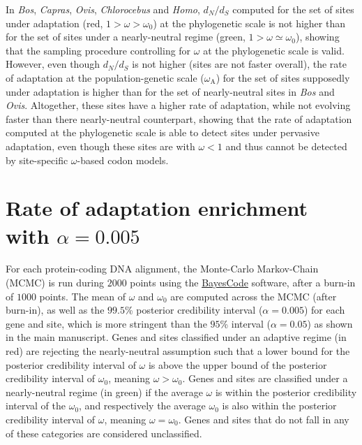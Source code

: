 \documentclass{article}
\renewcommand*{\bm}[1]{#1}%
\newcommand{\dn}{d_N}
\newcommand{\ds}{d_S}
\newcommand{\dnds}{\dn / \ds}
\newcommand{\rateApop}{\omega_{\mathrm{A}}}
\begin{document}
    In \textit{Bos}, \textit{Capras}, \textit{Ovis}, \textit{Chlorocebus} and \textit{Homo}, $\dnds$ computed for the set of sites under adaptation (red, $1 > \omega > \omega_{0}$) at the phylogenetic scale is not higher than for the set of sites under a nearly-neutral regime (green, $1 > \omega \simeq \omega_{0}$), showing that the sampling procedure controlling for $\omega$ at the phylogenetic scale is valid.
    However, even though $\dnds$ is not higher (sites are not faster overall), the rate of adaptation at the population-genetic scale ($\rateApop$) for the set of sites supposedly under adaptation is higher than for the set of nearly-neutral sites in \textit{Bos} and \textit{Ovis}.
    Altogether, these sites have a higher rate of adaptation, while not evolving faster than there nearly-neutral counterpart, showing that the rate of adaptation computed at the phylogenetic scale is able to detect sites under pervasive adaptation, even though these sites are with $\omega < 1$ and thus cannot be detected by site-specific $\omega$-based codon models.

    \pagebreak


    \section{Rate of adaptation enrichment with $\bm{\alpha=0.005}$}
    \label{sec:threshold}
    For each protein-coding DNA alignment, the Monte-Carlo Markov-Chain (MCMC) is run during $2000$ points using the \href{https://github.com/bayesiancook/bayescode}{BayesCode} software, after a burn-in of $1000$ points.
    The mean of $\omega$ and $\omega_{0}$ are computed across the MCMC (after burn-in), as well as the $99.5$\% posterior credibility interval ($\alpha=0.005$) for each gene and site, which is more stringent than the $95$\% interval ($\alpha=0.05$) as shown in the main manuscript.
    Genes and sites classified under an adaptive regime (in red) are rejecting the nearly-neutral assumption such that a lower bound for the posterior credibility interval of $\omega$ is above the upper bound of the posterior credibility interval of $\omega_{0}$, meaning $\omega > \omega_{0}$.
    Genes and sites are classified under a nearly-neutral regime (in green) if the average $\omega$ is within the posterior credibility interval of the $\omega_{0}$, and respectively the average $\omega_{0}$ is also within the posterior credibility interval of  $\omega$, meaning $\omega = \omega_{0}$.
    Genes and sites that do not fall in any of these categories are considered unclassified.
\end{document}
